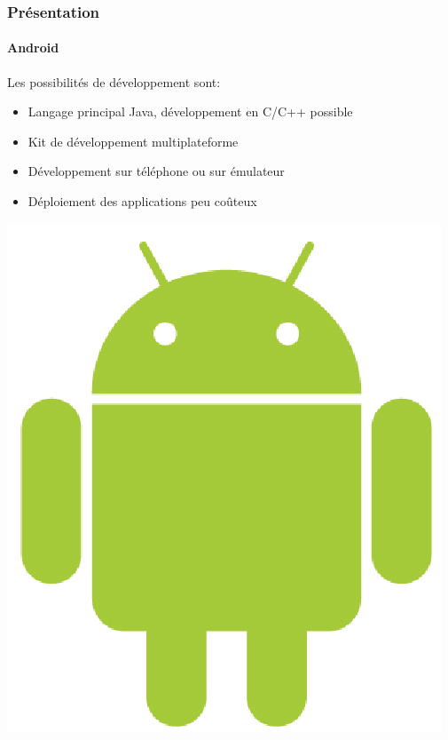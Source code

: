 \begin{frame}
\frametitle{Présentation}
\framesubtitle{Android}
	\begin{minipage}{8cm}
	Les possibilités de développement sont: \\ 

	\begin{itemize}
		\item Langage principal Java, développement en C/C++ possible
		\item Kit de développement multiplateforme
		\item Développement sur téléphone ou sur émulateur
		\item Déploiement des applications peu coûteux
	\end{itemize}
	\end{minipage}  \includegraphics[scale=0.2]{img/android.png} 
\end{frame}


 


